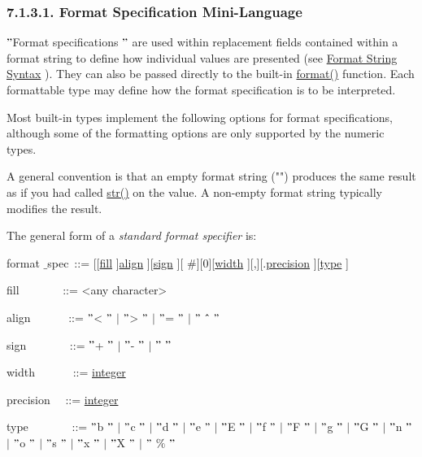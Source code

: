 \documentclass[a4paper,12pt]{report}
\begin{document}
\subsubsection*{7.1.3.1. Format Specification Mini-Language}
 \par
\noindent 
 $ " $Format specifications $ " $ are used within replacement fields contained within a format string to define how individual values are presented (see \href{https://docs.python.org/2/library/string.html}{Format String Syntax}
). They can also be passed directly to the built-in \href{https://docs.python.org/2/library/functions.html}{format()}
 function. Each formattable type may define how the format specification is to be interpreted. \par
\noindent 
Most built-in types implement the following options for format specifications, although some of the formatting options are only supported by the numeric types. \par
\noindent 
A general convention is that an empty format string ("") produces the same result as if you had called \href{https://docs.python.org/2/library/functions.html}{str()}
 on the value. A non-empty format string typically modifies the result. \par
\noindent 
The general form of a \emph{standard format specifier} is: \par
\noindent 
format $  \_  $spec~::=  [[\href{https://docs.python.org/2/library/string.html}{fill}
]\href{https://docs.python.org/2/library/string.html}{align}
][\href{https://docs.python.org/2/library/string.html}{sign}
][ $  \#  $][0][\href{https://docs.python.org/2/library/string.html}{width}
][,][.\href{https://docs.python.org/2/library/string.html}{precision}
][\href{https://docs.python.org/2/library/string.html}{type}
] \par
\noindent 
fill~~~~~~ ~::=  <any character> \par
\noindent 
align~~~~~ ~::=   $ " $< $ " $  $  \vert  $  $ " $> $ " $  $  \vert  $  $ " $= $ " $  $  \vert  $  $ " $ $  \string^  $ $ " $ \par
\noindent 
sign~~~~~~ ~::=   $ " $+ $ " $  $  \vert  $  $ " $- $ " $  $  \vert  $  $ " $  $ " $ \par
\noindent 
width~~~~~ ~::=  \href{https://docs.python.org/2/reference/lexical $  \_  $analysis.html}{integer}
 \par
\noindent 
precision~ ~::=  \href{https://docs.python.org/2/reference/lexical $  \_  $analysis.html}{integer}
 \par
\noindent 
type~~~~~~ ~::=   $ " $b $ " $  $  \vert  $  $ " $c $ " $  $  \vert  $  $ " $d $ " $  $  \vert  $  $ " $e $ " $  $  \vert  $  $ " $E $ " $  $  \vert  $  $ " $f $ " $  $  \vert  $  $ " $F $ " $  $  \vert  $  $ " $g $ " $  $  \vert  $  $ " $G $ " $  $  \vert  $  $ " $n $ " $  $  \vert  $  $ " $o $ " $  $  \vert  $  $ " $s $ " $  $  \vert  $  $ " $x $ " $  $  \vert  $  $ " $X $ " $  $  \vert  $  $ " $ $  \%  $ $ " $ \par
\end{document}

